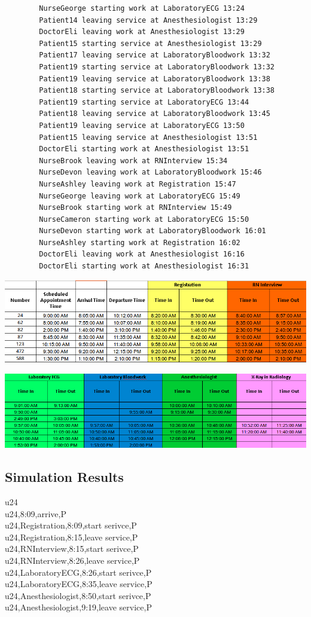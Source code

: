 \documentclass[12pt]{article}
\begin{document}
\begin{verbatim}
		NurseGeorge starting work at LaboratoryECG 13:24
		Patient14 leaving service at Anesthesiologist 13:29
		DoctorEli leaving work at Anesthesiologist 13:29
		Patient15 starting service at Anesthesiologist 13:29
		Patient17 leaving service at LaboratoryBloodwork 13:32
		Patient19 starting service at LaboratoryBloodwork 13:32
		Patient19 leaving service at LaboratoryBloodwork 13:38
		Patient18 starting service at LaboratoryBloodwork 13:38
		Patient19 starting service at LaboratoryECG 13:44
		Patient18 leaving service at LaboratoryBloodwork 13:45
		Patient19 leaving service at LaboratoryECG 13:50
		Patient15 leaving service at Anesthesiologist 13:51
		DoctorEli starting work at Anesthesiologist 13:51
		NurseBrook leaving work at RNInterview 15:34
		NurseDevon leaving work at LaboratoryBloodwork 15:46
		NurseAshley leaving work at Registration 15:47
		NurseGeorge leaving work at LaboratoryECG 15:49
		NurseBrook starting work at RNInterview 15:49
		NurseCameron starting work at LaboratoryECG 15:50
		NurseDevon starting work at LaboratoryBloodwork 16:01
		NurseAshley starting work at Registration 16:02
		DoctorEli leaving work at Anesthesiologist 16:16
		DoctorEli starting work at Anesthesiologist 16:31
		\end{verbatim}
		
\includegraphics[scale=0.5]{sample1.png}

\quad

\includegraphics[scale=0.5]{sample2.png}

\subsection{Simulation Results}

u24\\

u24,8:09,arrive,P\\
u24,Registration,8:09,start serivce,P\\
u24,Registration,8:15,leave service,P\\
u24,RNInterview,8:15,start serivce,P\\
u24,RNInterview,8:26,leave service,P\\
u24,LaboratoryECG,8:26,start serivce,P\\
u24,LaboratoryECG,8:35,leave service,P\\
u24,Anesthesiologist,8:50,start serivce,P\\
u24,Anesthesiologist,9:19,leave service,P\\
\end{document}
